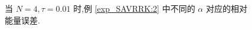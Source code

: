 \documentclass[aspectratio=169]{beamer}
\numberwithin{theorem}{section} %
\numberwithin{equation}{section}%
\numberwithin{figure}{section}%
\numberwithin{table}{section}%
\begin{document}
\begin{frame}%
	\begin{figure}[H]
		\begin{center}
		\caption{当 $N=4, \tau=0.01$ 时,例 \ref{exp_SAVRRK:2} 中不同的 $\alpha$ 对应的相对能量误差.}
		\label{fig_SAVRRK:2-4}
		\end{center}
		\end{figure}
\end{frame}
\end{document}
